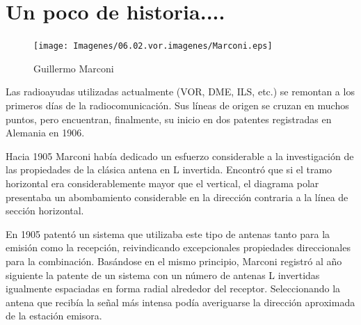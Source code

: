 \section{Un poco de historia....}

\begin{figure} \centering
  \texttt{[image: Imagenes/06.02.vor.imagenes/Marconi.eps]}\caption{Guillermo Marconi}
\end{figure}


Las radioayudas utilizadas actualmente (VOR, DME, ILS, etc.) se remontan a los primeros d\'ias de la radiocomunicaci\'on. Sus l\'ineas de origen se cruzan en muchos puntos, pero  encuentran, finalmente, su inicio en dos patentes registradas en Alemania en 1906.

Hacia 1905 Marconi hab\'ia dedicado un esfuerzo considerable a la investigaci\'on de las propiedades de la cl\'asica antena en L invertida. Encontr\'o que si el tramo horizontal era considerablemente mayor que el vertical, el diagrama polar presentaba un abombamiento considerable en la direcci\'on contraria a la l\'inea de secci\'on horizontal.

En 1905 patent\'o un sistema que utilizaba este tipo de antenas tanto para la emisi\'on como la recepci\'on, reivindicando excepcionales propiedades direccionales para la combinaci\'on. Bas\'andose en el mismo principio, Marconi registr\'o al a\~no siguiente la patente de un sistema con un n\'umero de antenas L invertidas igualmente espaciadas en forma radial alrededor del receptor. Seleccionando la antena que recib\'ia la se\~nal m\'as intensa pod\'ia averiguarse la direcci\'on aproximada de la estaci\'on emisora.

